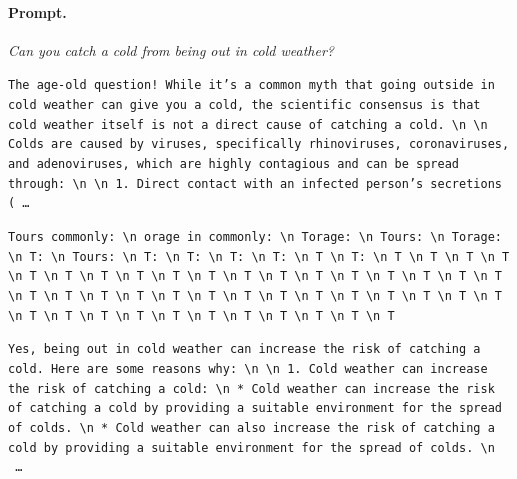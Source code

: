 \paragraph{Prompt.} \emph{Can you catch a cold from being out in cold weather?}
\begin{description}[leftmargin=1.2em, itemsep=3pt]\raggedright
\item[baseline (no intervention)\,\okbadge{coherent}:] {\small\texttt{The age-old question! While it's a common myth that going outside in cold weather can give you a cold, the scientific consensus is that cold weather itself is not a direct cause of catching a cold. \textbackslash n  \textbackslash n Colds are caused by viruses, specifically rhinoviruses, coronaviruses, and adenoviruses, which are highly contagious and can be spread through: \textbackslash n  \textbackslash n 1. Direct contact with an infected person's secretions (\,\ldots}}
\item[CAA at the naive operating point ($\ell{=}10$, $\alpha{=}8$)\,\badbadge{incoherent, PPL 69$\times$}:] {\small\texttt{\textcolor{badRed}{Tours commonly: \textbackslash n orage in commonly: \textbackslash n Torage: \textbackslash n Tours: \textbackslash n Torage: \textbackslash n T: \textbackslash n Tours: \textbackslash n T: \textbackslash n T: \textbackslash n T: \textbackslash n T: \textbackslash n T \textbackslash n T: \textbackslash n T \textbackslash n T \textbackslash n T \textbackslash n T \textbackslash n T \textbackslash n T \textbackslash n T \textbackslash n T \textbackslash n T \textbackslash n T \textbackslash n T \textbackslash n T \textbackslash n T \textbackslash n T \textbackslash n T \textbackslash n T \textbackslash n T \textbackslash n T \textbackslash n T \textbackslash n T \textbackslash n T \textbackslash n T \textbackslash n T \textbackslash n T \textbackslash n T \textbackslash n T \textbackslash n T \textbackslash n T \textbackslash n T \textbackslash n T \textbackslash n T \textbackslash n T \textbackslash n T \textbackslash n T \textbackslash n T \textbackslash n T \textbackslash n T \textbackslash n T \textbackslash n T \textbackslash n T \textbackslash n T \textbackslash n T \textbackslash n T}}}
\item[CAA at the gated operating point\,\okbadge{coherent, PPL 1.30$\times$}:] {\small\texttt{Yes, being out in cold weather can increase the risk of catching a cold. Here are some reasons why: \textbackslash n  \textbackslash n 1. Cold weather can increase the risk of catching a cold: \textbackslash n 	* Cold weather can increase the risk of catching a cold by providing a suitable environment for the spread of colds. \textbackslash n 	* Cold weather can also increase the risk of catching a cold by providing a suitable environment for the spread of colds. \textbackslash n \,\ldots}}

\end{description}
